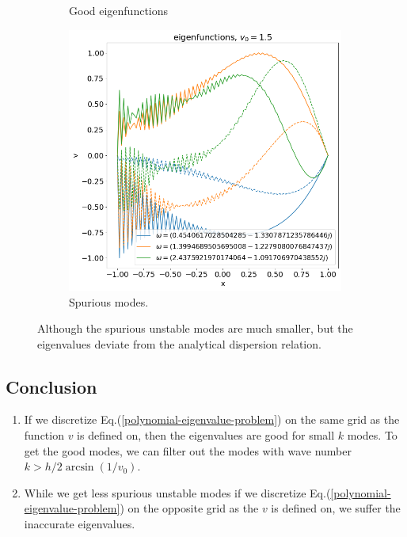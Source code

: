 \begin{figure}[H]
\begin{subfigure}[b]{0.3\linewidth}
		\caption{Good eigenfunctions}
		\label{fig:results-H-b}
	\end{subfigure}
	\begin{subfigure}[b]{0.3\linewidth}
		\includegraphics[width=\linewidth]{img/spectral_theory/eigfuncs_bad_H.png}
		\caption{Spurious modes.} 
		\label{fig:results-H-c}  
	\end{subfigure}
	\caption{Although the spurious unstable modes are much smaller, but the eigenvalues deviate from the analytical dispersion relation.}
	\label{fig:results-H}
\end{figure}

\subsection{Conclusion}
\begin{enumerate}
	\item If we discretize Eq.(\ref{polynomial-eigenvalue-problem}) on the same grid as the function $v$ is defined on, then the eigenvalues are good for small $k$ modes. To get the good modes, we can filter out the modes with wave number $k>h/2\arcsin(1/v_0)$.
	\item While we get less spurious unstable modes if we discretize Eq.(\ref{polynomial-eigenvalue-problem}) on the opposite grid as the $v$ is defined on, we suffer the inaccurate eigenvalues.
\end{enumerate}